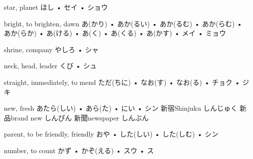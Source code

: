 



\setcounter{cardnum}{129}

		{star, planet}
		{ほし • セイ • ショウ}
		{}{}
		{}{}
		{}{}
		{}{}
		{}{}

		{bright, to brighten, dawn}
		{あ(かり) • あか(るい) • あか(るむ) • あか(らむ) • あか(らか) • あ(ける) • あ(く) • あ(くる) • あ(かす) • メイ • ミョウ}
		{}{}
		{}{}
		{}{}
		{}{}
		{}{}

		{shrine, company}
		{やしろ • シャ}
		{}{}
		{}{}
		{}{}
		{}{}
		{}{}

		{neck, head, leader}
		{くび • シュ}
		{}{}
		{}{}
		{}{}
		{}{}
		{}{}

		{straight, immediately, to mend}
		{ただ(ちに) • なお(す) • なお(る) • チョク • ジキ}
		{}{}
		{}{}
		{}{}
		{}{}
		{}{}

		{new, fresh}
		{あたら(しい) • あら(た) • にい • シン}
		{新宿}{Shinjuku しんじゅく}
		{新品}{brand new しんぴん}
		{新聞}{newspaper しんぶん}
		{}{}
		{}{}

		{parent, to be friendly, friendly}
		{おや • した(しい) • した(しむ) • シン}
		{}{}
		{}{}
		{}{}
		{}{}
		{}{}

		{number, to count}
		{かず • かぞ(える) • スウ • ス}
		{}{}
		{}{}
		{}{}
		{}{}
		{}{}

